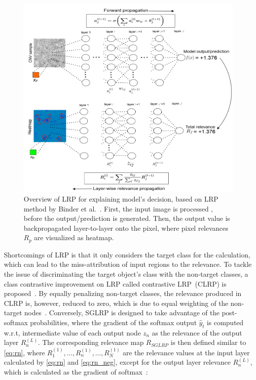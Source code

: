 \begin{figure}[h]
	\centering
	\includegraphics[scale=0.65]{images/lrp.png}	
    \caption{Overview of LRP for explaining model's decision, based on LRP method by Binder et al.~\cite{binder2016layer}. First, the input image is processed , before the output/prediction is generated. Then, the output value is backpropagated layer-to-layer onto the pixel, where pixel relevances $R_p$ are visualized as heatmap.}	
	\label{fig:explain_with_lrp}
\end{figure}

\hspace*{3.5mm} Shortcomings of LRP is that it only considers the target class for the calculation, which can lead to the miss-attribution of input regions to the relevance. To tackle the issue of discriminating the target object’s class with the non-target classes, a class contrastive improvement on LRP called contrastive LRP~(CLRP) is proposed~\cite{LRP3}. 
By equally penalizing non-target classes, the relevance produced in CLRP is, however, reduced to zero, which is due to equal weighting of the non-target nodes~\cite{ LRP2}. Conversely, SGLRP is designed to take advantage of the post-softmax probabilities, where the gradient of the softmax output $\hat{y}_{t}$ is computed w.r.t, intermediate value of each output node $z_{n}$ as the relevance of the output layer $R_{n}^{(L)}$. The corresponding relevance map $R_{SGLRP}$ is then defined similar to \cref{eq:rn}, where $R_{1}^{(1)}, \ldots, R_{n}^{(1)}, \ldots, R_{N}^{(1)}$ are the relevance values at the input layer calculated by \cref{eq:rn} and \cref{eq:rn_neg}, except for the output layer relevance $R_{n}^{(L)}$, which is calculated as the gradient of softmax~\cite{LRP2}:

